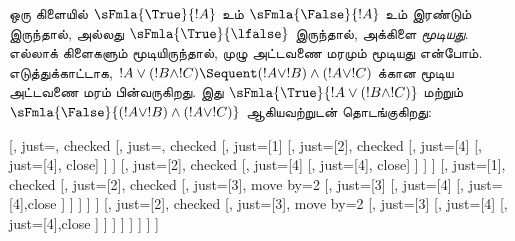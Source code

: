 \documentclass[../../../include/open-logic-section]{subfiles}
\begin{document}
ஒரு கிளையில் $\sFmla{\True}{!A}$ உம்
$\sFmla{\False}{!A}$ உம் இரண்டும் இருந்தால்,
அல்லது $\sFmla{\True}{\lfalse}$ இருந்தால்,
அக்கிளை \emph{மூடியது}. எல்லாக் கிளைகளும் மூடியிருந்தால்,
முழு அட்டவணை மரமும் மூடியது என்போம். எடுத்துக்காட்டாக,
$!A \lor (!B \land !C) \Sequent (!A \lor !B) \land
(!A \lor !C)$ க்கான மூடிய அட்டவணை மரம் பின்வருகிறது.
இது $\sFmla{\True}{!A \lor (!B \land !C)}$ மற்றும்
$\sFmla{\False}{(!A \lor !B) \land (!A \lor !C)}$
ஆகியவற்றுடன் தொடங்குகிறது:
\begin{maxwidth}
  \begin{tableau}{}
  [,
    just=\TAss, checked
    [, just=\TAss, checked
      [, just={\TRule{\True}{\lor}[1]}
        [,
          just={\TRule{\False}{\land}[2]}, checked
          [,
            just={\TRule{\False}{\lor}[4]}
            [,
              just={\TRule{\False}{\lor}[4]}, close]
          ]
        ]
        [,
          just={\TRule{\False}{\land}[2]}, checked
          [,
            just={\TRule{\False}{\lor}[4]}
            [,
              just={\TRule{\False}{\lor}[4]}, close]
          ]
        ]
      ]
      [,
        just={\TRule{\True}{\lor}[1]}, checked
        [,
          just={\TRule{\False}{\land}[2]}, checked
          [,
            just={\TRule{\True}{\land}[3]}, move by=2
            [,
              just={\TRule{\True}{\land}[3]}
              [,
                just={\TRule{\False}{\lor}[4]}
                [,
                  just={\TRule{\False}{\lor}[4]},close
                ]
              ]
            ]
          ]
        ]
        [,
          just={\TRule{\False}{\land}[2]}, checked
          [,
            just={\TRule{\True}{\land}[3]}, move by=2
              [,
                just={\TRule{\True}{\land}[3]}
                [,
                  just={\TRule{\False}{\lor}[4]}
                  [,
                  just={\TRule{\False}{\lor}[4]},close
                ]
              ]
            ]
          ]
        ]
      ]
    ]
  ]
\end{tableau}
\end{maxwidth}
\end{document}
